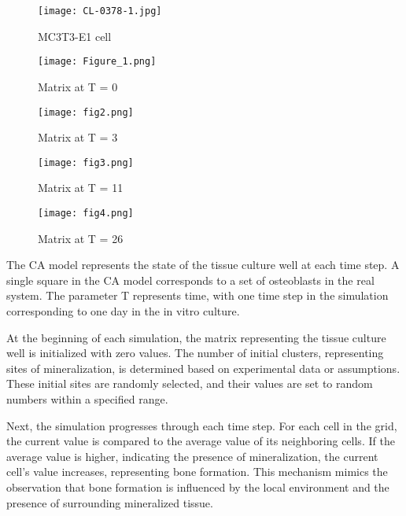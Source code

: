 \documentclass[conference]{IEEEtran}
\begin{document}
\begin{figure}
\centerline{\texttt{[image: CL-0378-1.jpg]}}

    \caption{MC3T3-E1 cell}
    \label{fig:my_label}
\end{figure}

\begin{figure}
\centerline{\texttt{[image: Figure\_1.png]}}

    \caption{Matrix at T = 0}
    \label{fig:matrixT}
\end{figure}

\begin{figure}
\centerline{\texttt{[image: fig2.png]}}

    \caption{Matrix at T = 3}
    \label{fig:matrixT3}
\end{figure}
\begin{figure}
\centerline{\texttt{[image: fig3.png]}}

    \caption{Matrix at T = 11}
    \label{fig:matrixT11}
\end{figure}
\begin{figure}
\centerline{\texttt{[image: fig4.png]}}

    \caption{Matrix at T = 26}
    \label{fig:matrixT26}
\end{figure}
The CA model represents the state of the tissue culture well at each time step. A single square in the CA model corresponds to a set of osteoblasts in the real system. The parameter T represents time, with one time step in the simulation corresponding to one day in the in vitro culture.

At the beginning of each simulation, the matrix representing the tissue culture well is initialized with zero values. The number of initial clusters, representing sites of mineralization, is determined based on experimental data or assumptions. These initial sites are randomly selected, and their values are set to random numbers within a specified range.

Next, the simulation progresses through each time step. For each cell in the grid, the current value is compared to the average value of its neighboring cells. If the average value is higher, indicating the presence of mineralization, the current cell's value increases, representing bone formation. This mechanism mimics the observation that bone formation is influenced by the local environment and the presence of surrounding mineralized tissue.
\end{document}
